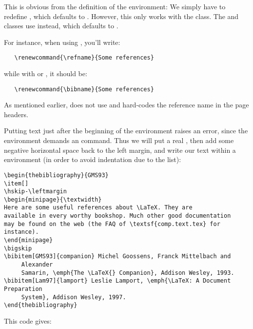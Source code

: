 
This is obvious from the definition of the 
environment: We simply have to redefine , which defaults
to \emph{\refname}. However, this
only works with the  class. The  and
 classes use  instead, which defaults to
\emph{\bibname}. 

For instance, when using , you'll write:
\begin{verbatim}
   \renewcommand{\refname}{Some references}
\end{verbatim}
while with  or , it should be:
\begin{verbatim}
   \renewcommand{\bibname}{Some references}
\end{verbatim}
As mentioned earlier,  does not use  and hard-codes
the reference name in the page headers.


Putting text just after the beginning of the 
environment raises an error, since the  environment demands
an  command. Thus we will put a real , then add
some negative horizontal space back to the left margin, and write our
text within a  environment (in order to avoid
indentation due to the list):

\begin{verbatim}
\begin{thebibliography}{GMS93}
\item[]
\hskip-\leftmargin
\begin{minipage}{\textwidth}
Here are some useful references about \LaTeX. They are
available in every worthy bookshop. Much other good documentation
may be found on the web (the FAQ of \textsf{comp.text.tex} for
instance). 
\end{minipage}
\bigskip
\bibitem[GMS93]{companion} Michel Goossens, Franck Mittelbach and
     Alexander 
     Samarin, \emph{The \LaTeX{} Companion}, Addison Wesley, 1993.
\bibitem[Lam97]{lamport} Leslie Lamport, \emph{\LaTeX: A Document Preparation
     System}, Addison Wesley, 1997.
\end{thebibliography}
\end{verbatim}
This code gives:

